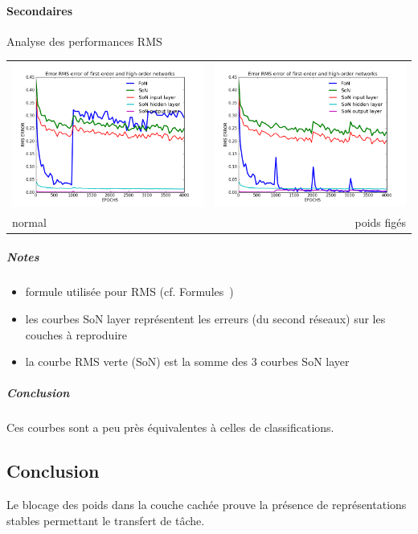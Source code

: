     \paragraph{Secondaires}
       Analyse des performances RMS
      \begin{center}
	\begin{tabular}{lr}
	  \hspace*{-1cm}
	  \includegraphics[width=250px]{data/expB2/rms.png}
	  &
	  \includegraphics[width=250px]{data/expB2/rms_block.png} \\
	  normal
	  &
	  poids figés
	\end{tabular}
      \end{center} 
      \subparagraph{Notes}
	\begin{itemize}
	  \item formule utilisée pour RMS (cf. Formules~)
	  \item les courbes SoN layer représentent les erreurs (du second réseaux) sur les couches à reproduire 
	  \item la courbe RMS verte (SoN) est la somme des 3 courbes SoN layer
	\end{itemize}
      \subparagraph{Conclusion}
	Ces courbes sont a peu près équivalentes à celles de classifications.

  \subsection{Conclusion}
    Le blocage des poids dans la couche cachée prouve la présence de représentations stables permettant le 
  transfert de tâche.
  

